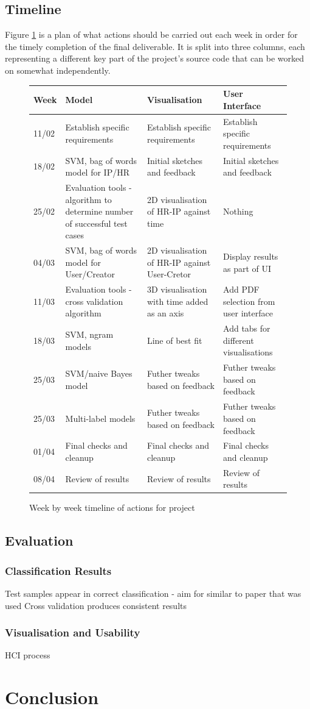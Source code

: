 		\subsection{Timeline}
			Figure \ref{tab:timeline} is a plan of what actions should be carried out each week in order for the timely completion of the final deliverable. It is split into three columns, each representing a different key part of the project's source code that can be worked on somewhat independently. 
			\FloatBarrier
			\begin{figure}[hbt!]
				\begin{tabular}{ p{0.8cm}|p{4.5cm}|p{4.5cm}|p{4.5cm} } 
					\hline
					\textbf{Week} & \textbf{Model} & \textbf{Visualisation} & \textbf{User Interface} \\ \hline
					11/02 & Establish specific requirements & Establish specific requirements & Establish specific requirements \\  \hline
					18/02 & SVM, bag of words model for IP/HR & Initial sketches and feedback & Initial sketches and feedback \\  \hline
					25/02 & Evaluation tools - algorithm to determine number of successful test cases & 2D visualisation of HR-IP against time & Nothing \\  \hline
					04/03 & SVM, bag of words model for User/Creator & 2D visualisation of HR-IP against User-Cretor & Display results as part of UI\\  \hline
					11/03 & Evaluation tools - cross validation algorithm & 3D visualisation with time added as an axis & Add PDF selection from user interface \\  \hline
					18/03 & SVM, ngram models & Line of best fit & Add tabs for different visualisations \\  \hline
					25/03 & SVM/naive Bayes model & Futher tweaks based on feedback & Futher tweaks based on feedback \\  \hline
					25/03 & Multi-label models & Futher tweaks based on feedback & Futher tweaks based on feedback \\  \hline
					01/04 & Final checks and cleanup & Final checks and cleanup & Final checks and cleanup\\  \hline
					08/04 & Review of results & Review of results & Review of results \\
				\end{tabular}
				\caption{Week by week timeline of actions for project}\label{tab:timeline}
			\end{figure}
			\FloatBarrier
		\subsection{Evaluation}
			\subsubsection{Classification Results}
				Test samples appear in correct classification - aim for similar to paper that was used
				Cross validation produces consistent results
			\subsubsection{Visualisation and Usability}
				HCI process
	\section{Conclusion}
	